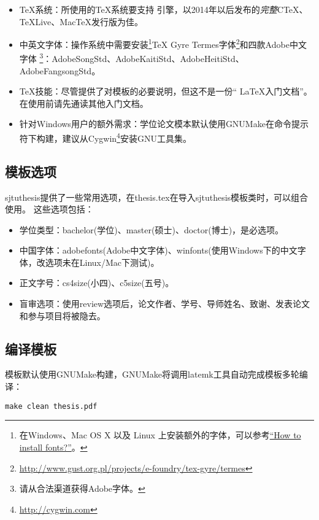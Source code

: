 \begin{itemize}[noitemsep,topsep=0pt,parsep=0pt,partopsep=0pt]
	\item {\TeX}系统：所使用的{\TeX}系统要支持 \XeTeX 引擎，以2014年以后发布的\emph{完整}CTeX、TeXLive、MacTeX发行版为佳。
	\item 中英文字体：操作系统中需要安装\footnote{在Windows、Mac OS X 以及 Linux 上安装额外的字体，可以参考\href{https://www.searchfreefonts.com/articles/how-to-install-fonts.htm}{“How to install fonts?”}。
}TeX Gyre Termes字体\footnote{\url{http://www.gust.org.pl/projects/e-foundry/tex-gyre/termes}}和四款Adobe中文字体
\footnote{请从合法渠道获得Adobe字体。}：AdobeSongStd、AdobeKaitiStd、AdobeHeitiStd、AdobeFangsongStd。
	\item TeX技能：尽管提供了对模板的必要说明，但这不是一份“ \LaTeX 入门文档”。在使用前请先通读其他入门文档。
	\item 针对Windows用户的额外需求：学位论文模本默认使用GNUMake在命令提示符下构建，建议从Cygwin\footnote{\url{http://cygwin.com}}安装GNU工具集。
\end{itemize}

\subsection{模板选项}
\label{sec:thesisoption}

sjtuthesis提供了一些常用选项，在thesis.tex在导入sjtuthesis模板类时，可以组合使用。
这些选项包括：

\begin{itemize}[noitemsep,topsep=0pt,parsep=0pt,partopsep=0pt]
\item 学位类型：bachelor(学位)、master(硕士)、doctor(博士)，是必选项。
\item 中国字体：adobefonts(Adobe中文字体)、winfonts(使用Windows下的中文字体，改选项未在Linux/Mac下测试)。
\item 正文字号：cs4size(小四)、c5size(五号)。
\item 盲审选项：使用review选项后，论文作者、学号、导师姓名、致谢、发表论文和参与项目将被隐去。
\end{itemize}

\subsection{编译模板}
\label{sec:process}

模板默认使用GNUMake构建，GNUMake将调用latemk工具自动完成模板多轮编译：

\begin{lstlisting}[basicstyle=\small\ttfamily, caption={编译模板}, numbers=none]
make clean thesis.pdf
\end{lstlisting}

